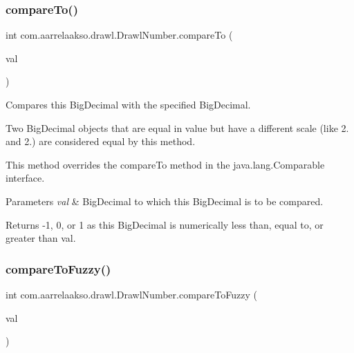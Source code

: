 \subsubsection{\texorpdfstring{compare\+To()}{compareTo()}}
{\footnotesize\ttfamily int com.\+aarrelaakso.\+drawl.\+Drawl\+Number.\+compare\+To (\begin{DoxyParamCaption}\item[{@Not\+Null \hyperlink{classcom_1_1aarrelaakso_1_1drawl_1_1_drawl_number}{Drawl\+Number}}]{val }\end{DoxyParamCaption})}



Compares this Big\+Decimal with the specified Big\+Decimal. 

Two Big\+Decimal objects that are equal in value but have a different scale (like 2. and 2.) are considered equal by this method. 

This method overrides the compare\+To method in the java.\+lang.\+Comparable interface.


\begin{DoxyParams}{Parameters}
{\em val} & Big\+Decimal to which this Big\+Decimal is to be compared. \\
\hline
\end{DoxyParams}
\begin{DoxyReturn}{Returns}
-\/1, 0, or 1 as this Big\+Decimal is numerically less than, equal to, or greater than val. 
\end{DoxyReturn}
\mbox{\label{classcom_1_1aarrelaakso_1_1drawl_1_1_drawl_number_a3919eb2219b8e91e526f0f8b16cae162}} 
\subsubsection{\texorpdfstring{compare\+To\+Fuzzy()}{compareToFuzzy()}\hspace{0.1cm}{\footnotesize\ttfamily [1/2]}}
{\footnotesize\ttfamily int com.\+aarrelaakso.\+drawl.\+Drawl\+Number.\+compare\+To\+Fuzzy (\begin{DoxyParamCaption}\item[{\hyperlink{classcom_1_1aarrelaakso_1_1drawl_1_1_drawl_number}{Drawl\+Number}}]{val }\end{DoxyParamCaption})\hspace{0.3cm}{\ttfamily [protected]}}



